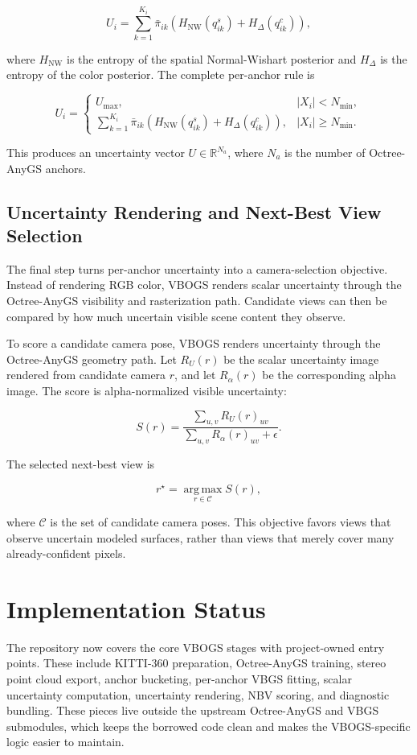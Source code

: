 \documentclass{article}
\begin{document}
\[
  U_i
  =
  \sum_{k=1}^{K_i}
  \bar{\pi}_{ik}
  \left(
    H_{\mathrm{NW}}(q^s_{ik})
    +
    H_{\Delta}(q^c_{ik})
  \right),
\]

where \(H_{\mathrm{NW}}\) is the entropy of the spatial Normal-Wishart posterior and \(H_{\Delta}\) is the entropy of the color posterior. The complete per-anchor rule is

\[
  U_i =
  \begin{cases}
    U_{\max}, & |X_i| < N_{\min}, \\
    \sum_{k=1}^{K_i}
    \bar{\pi}_{ik}
    \left(
      H_{\mathrm{NW}}(q^s_{ik})
      +
      H_{\Delta}(q^c_{ik})
    \right), & |X_i| \geq N_{\min}.
  \end{cases}
\]

This produces an uncertainty vector \(U \in \mathbb{R}^{N_a}\), where \(N_a\) is the number of Octree-AnyGS anchors.

\subsection{Uncertainty Rendering and Next-Best View Selection}
The final step turns per-anchor uncertainty into a camera-selection objective. Instead of rendering RGB color, VBOGS renders scalar uncertainty through the Octree-AnyGS visibility and rasterization path. Candidate views can then be compared by how much uncertain visible scene content they observe.

To score a candidate camera pose, VBOGS renders uncertainty through the Octree-AnyGS geometry path. Let \(R_U(r)\) be the scalar uncertainty image rendered from candidate camera \(r\), and let \(R_\alpha(r)\) be the corresponding alpha image. The score is alpha-normalized visible uncertainty:

\[
  S(r)
  =
  \frac{\sum_{u,v} R_U(r)_{uv}}
       {\sum_{u,v} R_\alpha(r)_{uv} + \epsilon}.
\]

The selected next-best view is

\[
  r^\star =
  \operatorname*{arg\,max}_{r \in \mathcal{C}} S(r),
\]

where \(\mathcal{C}\) is the set of candidate camera poses. This objective favors views that observe uncertain modeled surfaces, rather than views that merely cover many already-confident pixels.

\section{Implementation Status}
The repository now covers the core VBOGS stages with project-owned entry points. These include KITTI-360 preparation, Octree-AnyGS training, stereo point cloud export, anchor bucketing, per-anchor VBGS fitting, scalar uncertainty computation, uncertainty rendering, NBV scoring, and diagnostic bundling. These pieces live outside the upstream Octree-AnyGS and VBGS submodules, which keeps the borrowed code clean and makes the VBOGS-specific logic easier to maintain.
\end{document}

